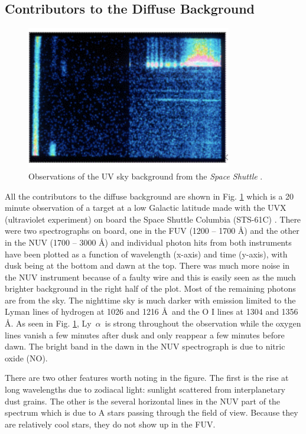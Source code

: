 \documentclass{iau}
\newcommand{\lya}{Ly~$\alpha$}
\begin{document}
\subsection{Contributors to the Diffuse Background}

\begin{figure}[t]
\begin{center}
 \includegraphics[width=0.8\textwidth]{UVX-image.pdf} 
 \caption{Observations of the UV sky background from the {\it Space Shuttle} \citep{murthyUVX}.}
  \label{Fig:UVX}
\end{center}
\end{figure}

All the contributors to the diffuse background are shown in Fig. \ref{Fig:UVX} which is a 20 minute observation of a target at a low Galactic latitude made with the UVX (ultraviolet experiment) on board the Space Shuttle Columbia (STS-61C) \citep{murthyUVX}. There were two spectrographs on board, one in the FUV (1200 -- 1700 \AA) and the other in the NUV (1700 -- 3000 \AA) and individual photon hits from both instruments have been plotted as a function of wavelength (x-axis) and time (y-axis), with dusk being at the bottom and dawn at the top. There was much more noise in the NUV instrument because of a faulty wire and this is easily seen as the much brighter background in the right half of the plot. Most of the remaining photons are from the sky. The nighttime sky is much darker with emission limited to the Lyman lines of hydrogen at 1026 and 1216 \AA\ and the O I lines at 1304 and 1356 \AA. As seen in Fig. \ref{Fig:UVX}, \lya\ is strong throughout the observation while the oxygen lines vanish a few minutes after dusk and only reappear a few minutes before dawn. The bright band in the dawn in the NUV spectrograph is due to nitric oxide (NO).

There are two other features worth noting in the figure. The first is the rise at long wavelengths due to zodiacal light: sunlight scattered from interplanetary dust grains. The other is the several horizontal lines in the NUV part of the spectrum which is due to A stars passing through the field of view. Because they are relatively cool stars, they do not show up in the FUV.
\end{document}
